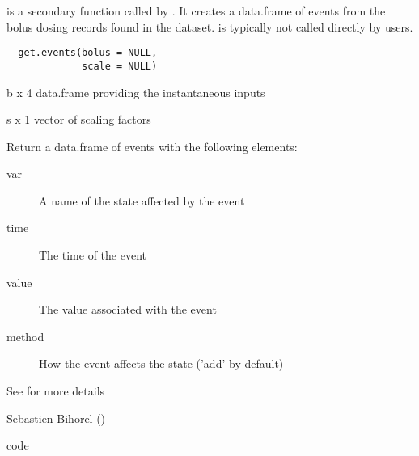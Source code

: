 %
\begin{Description}\relax
{} is a secondary function called by . It 
creates a data.frame of events from the bolus dosing records found in the 
dataset.  is typically not called directly by users.
\end{Description}
%
\begin{Usage}
\begin{verbatim}
  get.events(bolus = NULL, 
             scale = NULL)
\end{verbatim}
\end{Usage}
%
\begin{Arguments}
\begin{ldescription}
\item[\code{bolus}] b x 4 data.frame providing the instantaneous inputs
\item[\code{scale}] s x 1 vector of scaling factors
\end{ldescription}
\end{Arguments}
%
\begin{Value}
Return a data.frame of events with the following elements: \begin{description}

\item[var] A name of the state affected by the event
\item[time] The time of the event
\item[value] The value associated with the event
\item[method] How the event affects the state ('add' by default)

\end{description}

See  for more details
\end{Value}
%
\begin{Author}\relax
Sebastien Bihorel ()
\end{Author}
%
\begin{SeeAlso}\relax
code
\end{SeeAlso}
